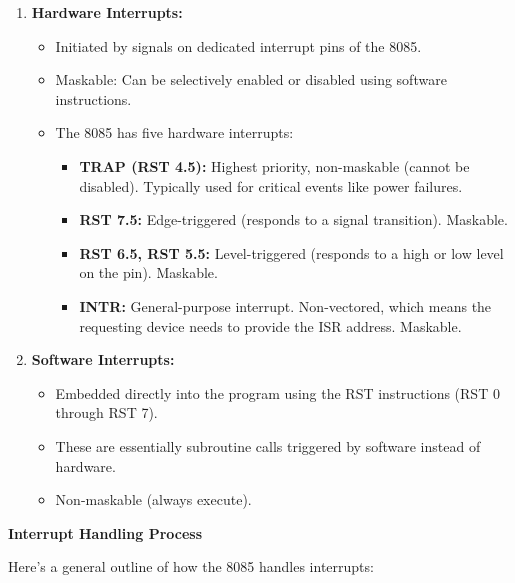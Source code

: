 \documentclass[
]{article}
\begin{document}
\begin{enumerate}
\def\labelenumi{\arabic{enumi}.}
\item
  \textbf{Hardware Interrupts:}

  \begin{itemize}
  \item
    Initiated by signals on dedicated interrupt pins of the 8085.
  \item
    Maskable: Can be selectively enabled or disabled using software
    instructions.
  \item
    The 8085 has five hardware interrupts:

    \begin{itemize}
    \item
      \textbf{TRAP (RST 4.5):} Highest priority, non-maskable (cannot be
      disabled). Typically used for critical events like power failures.
    \item
      \textbf{RST 7.5:} Edge-triggered (responds to a signal
      transition). Maskable.
    \item
      \textbf{RST 6.5, RST 5.5:} Level-triggered (responds to a high or
      low level on the pin). Maskable.
    \item
      \textbf{INTR:} General-purpose interrupt. Non-vectored, which
      means the requesting device needs to provide the ISR address.
      Maskable.
    \end{itemize}
  \end{itemize}
\item
  \textbf{Software Interrupts:}

  \begin{itemize}
  \item
    Embedded directly into the program using the RST instructions (RST 0
    through RST 7).
  \item
    These are essentially subroutine calls triggered by software instead
    of hardware.
  \item
    Non-maskable (always execute).
  \end{itemize}
\end{enumerate}

\textbf{Interrupt Handling Process}

Here's a general outline of how the 8085 handles interrupts:
\end{document}
